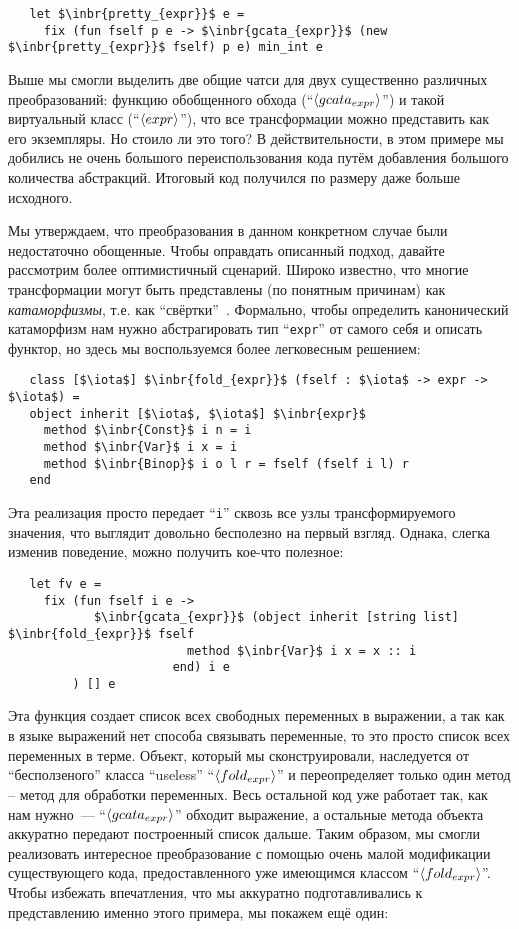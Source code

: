 \begin{lstlisting}
   let $\inbr{pretty_{expr}}$ e =
     fix (fun fself p e -> $\inbr{gcata_{expr}}$ (new $\inbr{pretty_{expr}}$ fself) p e) min_int e
\end{lstlisting}

Выше мы смогли выделить две общие чатси для двух существенно различных преобразований: функцию обобщенного обхода
(``$\left<gcata_{expr}\right>$'') и такой виртуальный класс (``$\left<expr\right>$''), что все трансформации можно представить как его экземпляры.
Но стоило ли это того? В действительности, в этом примере мы добились не очень большого переиспользования кода путём добавления
большого количества абстракций. Итоговый код получился по размеру даже больше исходного.

Мы утверждаем, что преобразования в данном конкретном случае были недостаточно обощенные. Чтобы оправдать описанный подход,
давайте рассмотрим более оптимистичный сценарий. Широко известно, что многие трансформации могут быть представлены 
(по понятным причинам) как \emph{катаморфизмы}, т.е. как ``свёртки''~\cite{Fold,Bananas,CalculatingFP}. 
Формально, чтобы определить канонический катаморфизм нам нужно абстрагировать тип ``\lstinline{expr}'' 
от самого себя и описать функтор, но здесь мы воспользуемся более легковесным решением:

\begin{lstlisting}
   class [$\iota$] $\inbr{fold_{expr}}$ (fself : $\iota$ -> expr -> $\iota$) =
   object inherit [$\iota$, $\iota$] $\inbr{expr}$ 
     method $\inbr{Const}$ i n = i
     method $\inbr{Var}$ i x = i
     method $\inbr{Binop}$ i o l r = fself (fself i l) r
   end
\end{lstlisting}

Эта реализация просто передает ``\lstinline{i}'' сквозь все узлы трансформируемого значения, что выглядит довольно бесполезно на первый взгляд.
Однака, слегка изменив поведение, можно получить кое-что полезное:

\begin{lstlisting}
   let fv e =
     fix (fun fself i e ->
            $\inbr{gcata_{expr}}$ (object inherit [string list] $\inbr{fold_{expr}}$ fself
                         method $\inbr{Var}$ i x = x :: i
                       end) i e
         ) [] e
\end{lstlisting}

Эта функция создает список всех свободных переменных в выражении, а так как в языке выражений нет способа связывать переменные, 
то это просто список всех переменных в терме. Объект, который мы сконструировали, наследуется от ``бесползеного'' класса 
``useless'' ``$\left<fold_{expr}\right>$'' и переопределяет только один метод -- метод для обработки переменных.
Весь остальной код уже работает так, как нам нужно~--- ``$\left<gcata_{expr}\right>$'' обходит выражение, 
а остальные метода объекта аккуратно передают построенный список дальше.
Таким образом, мы смогли реализовать интересное преобразование с помощью очень малой модификации существующего кода, 
предоставленного уже имеющимся классом ``$\left<fold_{expr}\right>$''. Чтобы избежать впечатления, что мы аккуратно подготавливались к
представлению именно этого примера, мы покажем ещё один:

